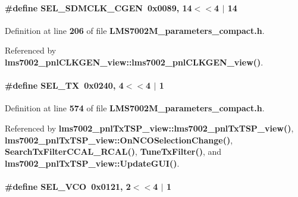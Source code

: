 \paragraph[{S\+E\+L\+\_\+\+S\+D\+M\+C\+L\+K\+\_\+\+C\+G\+EN}]{\setlength{\rightskip}{0pt plus 5cm}\#define S\+E\+L\+\_\+\+S\+D\+M\+C\+L\+K\+\_\+\+C\+G\+EN~0x0089, 14$<$$<$4 $\vert$  14}\label{LMS7002M__parameters__compact_8h_aefaf49c0f8dd6674a5e2b4180385f0d2}


Definition at line {\bf 206} of file {\bf L\+M\+S7002\+M\+\_\+parameters\+\_\+compact.\+h}.



Referenced by {\bf lms7002\+\_\+pnl\+C\+L\+K\+G\+E\+N\+\_\+view\+::lms7002\+\_\+pnl\+C\+L\+K\+G\+E\+N\+\_\+view()}.

\paragraph[{S\+E\+L\+\_\+\+TX}]{\setlength{\rightskip}{0pt plus 5cm}\#define S\+E\+L\+\_\+\+TX~0x0240, 4$<$$<$4 $\vert$  1}\label{LMS7002M__parameters__compact_8h_a1db67f66feba86e62726e8a9e91d0fb7}


Definition at line {\bf 574} of file {\bf L\+M\+S7002\+M\+\_\+parameters\+\_\+compact.\+h}.



Referenced by {\bf lms7002\+\_\+pnl\+Tx\+T\+S\+P\+\_\+view\+::lms7002\+\_\+pnl\+Tx\+T\+S\+P\+\_\+view()}, {\bf lms7002\+\_\+pnl\+Tx\+T\+S\+P\+\_\+view\+::\+On\+N\+C\+O\+Selection\+Change()}, {\bf Search\+Tx\+Filter\+C\+C\+A\+L\+\_\+\+R\+C\+A\+L()}, {\bf Tune\+Tx\+Filter()}, and {\bf lms7002\+\_\+pnl\+Tx\+T\+S\+P\+\_\+view\+::\+Update\+G\+U\+I()}.

\paragraph[{S\+E\+L\+\_\+\+V\+CO}]{\setlength{\rightskip}{0pt plus 5cm}\#define S\+E\+L\+\_\+\+V\+CO~0x0121, 2$<$$<$4 $\vert$  1}\label{LMS7002M__parameters__compact_8h_ab84ed92e28727fe139cb2dbd2dc37f3f}



